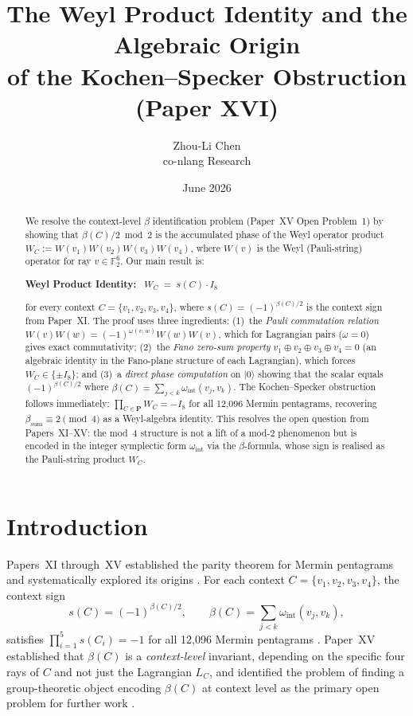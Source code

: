 \documentclass[11pt,a4paper]{article}
\title{The Weyl Product Identity and the Algebraic Origin\\
       of the Kochen--Specker Obstruction\\
       {\large (Paper XVI)}}
\author{Zhou-Li Chen \\ co-nlang Research}
\date{June 2026}
\theoremstyle{remark}
\begin{document}
\maketitle

\begin{abstract}
We resolve the context-level $\beta$ identification problem
(Paper~XV Open Problem~1) by showing that $\beta(C)/2 \bmod 2$ is
the accumulated phase of the Weyl operator product
$W_C := W(v_1)W(v_2)W(v_3)W(v_4)$,
where $W(v)$ is the Weyl (Pauli-string) operator for ray $v \in \mathbb{F}_2^6$.
Our main result is:

\begin{center}
\textbf{Weyl Product Identity:}~
$W_C \;=\; s(C) \cdot I_8$
\end{center}

for every context $C = \{v_1, v_2, v_3, v_4\}$,
where $s(C) = (-1)^{\beta(C)/2}$ is the context sign from Paper~XI.
The proof uses three ingredients:
(1)~the \emph{Pauli commutation relation}
$W(v)W(w) = (-1)^{\omega(v,w)} W(w)W(v)$, which for Lagrangian pairs
($\omega=0$) gives exact commutativity;
(2)~the \emph{Fano zero-sum property}
$v_1 \oplus v_2 \oplus v_3 \oplus v_4 = 0$ (an algebraic identity in the
Fano-plane structure of each Lagrangian), which forces
$W_C \in \{\pm I_8\}$;
and (3)~a \emph{direct phase computation} on $|0\rangle$ showing that
the scalar equals $(-1)^{\beta(C)/2}$ where
$\beta(C) = \sum_{j<k} \omega_{\mathrm{int}}(v_j, v_k)$.
The Kochen--Specker obstruction follows immediately:
$\prod_{C \in \mathbf{P}} W_C = -I_8$
for all 12{,}096 Mermin pentagrams,
recovering $\beta_{\mathrm{sum}} \equiv 2 \pmod 4$
as a Weyl-algebra identity.
This resolves the open question from Papers~XI--XV:
the mod~4 structure is not a lift of a mod-2 phenomenon but
is encoded in the integer symplectic form $\omega_{\mathrm{int}}$
via the $\beta$-formula, whose sign is realised as the
Pauli-string product $W_C$.
\end{abstract}


\section{Introduction}

Papers~XI through~XV established the parity theorem for Mermin pentagrams
and systematically explored its origins
\cite{PaperXI,PaperXII,PaperXIII,PaperXIV,PaperXV}.
For each context $C = \{v_1,v_2,v_3,v_4\}$, the context sign
\[
  s(C) = (-1)^{\beta(C)/2}, \qquad
  \beta(C) = \sum_{j<k} \omega_{\mathrm{int}}(v_j, v_k),
\]
satisfies $\prod_{i=1}^5 s(C_i) = -1$ for all 12{,}096 Mermin pentagrams
\cite{PaperXI}.
Paper~XV established that $\beta(C)$ is a \emph{context-level} invariant,
depending on the specific four rays of $C$ and not just the
Lagrangian $L_C$, and identified the problem of finding a
group-theoretic object encoding $\beta(C)$ at context level as the
primary open problem for further work \cite{PaperXV}.
\end{document}
